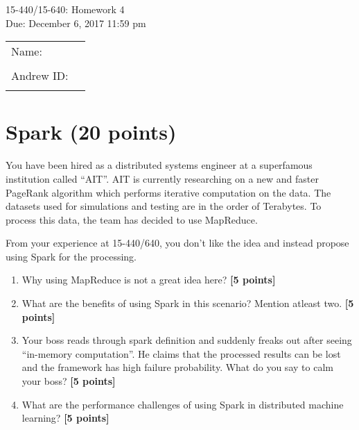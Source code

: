 \documentclass{article}
\newcommand{\mycoursenum}{15-440/15-640}
\newcommand{\myhwnum}{4}
\newcommand{\myname}{}   %
\newcommand{\myandrew}{}  %
\begin{document}
\medskip
\thispagestyle{plain}
\begin{center}
{\Large \mycoursenum: Homework \myhwnum}\\
Due: December 6, 2017 11:59 pm \\
\medskip
\begin{tabular}{| l p{3in}|}
\hline
Name: \myname& \\
& \\ \hline
Andrew ID: \myandrew & \\
&\\
\hline
\end{tabular}
\end{center}



\section {Spark (20 points)}

You have been hired as a distributed systems engineer at a superfamous institution called ``AIT''. AIT is currently researching on a new and faster PageRank algorithm which performs iterative computation on the data. The datasets used for simulations and testing are in the order of Terabytes. To process this data, the team has decided to use MapReduce. 

From your experience at 15-440/640, you don't like the idea and instead propose using Spark for the processing.

\begin{enumerate}
\item{ Why using MapReduce is not a great idea here? \textbf{[5 points]}}

\item{ What are the benefits of using Spark in this scenario? Mention atleast two. \textbf{[5 points]}}

\item{ Your boss reads through spark definition and suddenly freaks out after seeing ``in-memory computation''. He claims that the processed results can be lost and the framework has high failure probability. What do you say to calm your boss? \textbf{[5 points]}}

\item{ What are the performance challenges of using Spark in distributed machine learning? \textbf{[5 points]}}

\end{enumerate}
\end{document}

